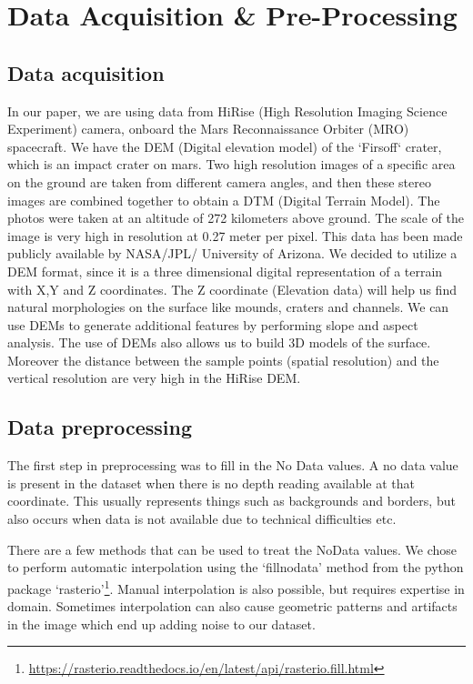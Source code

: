 \documentclass[sigconf,natbib=false]{acmart}
\begin{document}
\section{Data Acquisition \& Pre-Processing}
\subsection{Data acquisition}
 In our paper, we are using data from HiRise (High Resolution Imaging Science Experiment) camera, onboard the Mars Reconnaissance Orbiter (MRO) spacecraft. We have the DEM (Digital elevation model) of the ‘Firsoff‘ crater, which is an impact crater on mars. Two high resolution images of a specific area on the ground are taken from different camera angles, and then these stereo images are combined together to obtain a DTM (Digital Terrain Model). The photos were taken at an altitude of 272 kilometers above ground. The scale of the image is very high in resolution at 0.27 meter per pixel. This data has been made publicly available by NASA/JPL/ University of Arizona. 
 We decided to utilize a DEM format, since it is a three dimensional digital representation of a terrain with X,Y and Z coordinates. The Z coordinate (Elevation data) will help us find natural morphologies on the surface like mounds, craters and channels. We can use DEMs to generate additional features by performing slope and aspect analysis. The use of DEMs also allows us to build 3D models of the surface. Moreover the distance between the sample points (spatial resolution) and the vertical resolution are very high in the HiRise DEM.

\subsection{Data preprocessing}
The first step in preprocessing was to fill in the No Data values. A no data value is present in the dataset when there is no depth reading available at that coordinate. This usually represents things such as backgrounds and borders, but also occurs when data is not available due to technical difficulties etc. 

There are a few methods that can be used to treat the NoData values. We chose to perform automatic interpolation using the ‘fillnodata’ method from the python package ‘rasterio’\footnote{\url{https://rasterio.readthedocs.io/en/latest/api/rasterio.fill.html}}. Manual interpolation is also possible, but requires expertise in domain. Sometimes interpolation can also cause geometric patterns and artifacts in the image which end up adding noise to our dataset.
\end{document}
